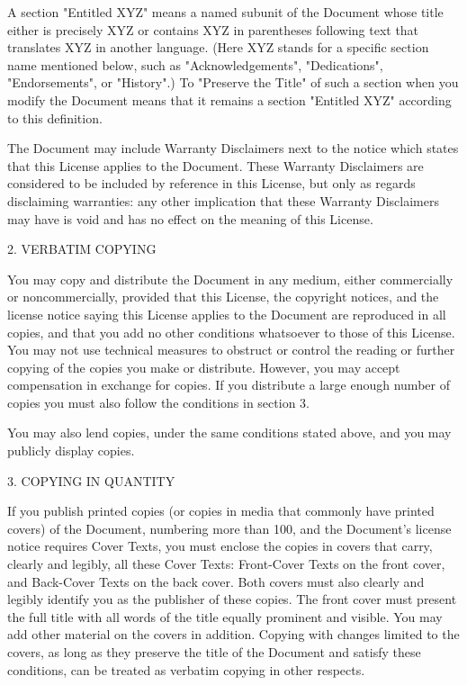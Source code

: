 \documentclass[oneside,english,a4paper,10pt,oneside,openany,final]{memoir}
\begin{document}
A section "Entitled XYZ" means a named subunit of the Document whose title either is precisely XYZ or contains XYZ in parentheses following text that translates XYZ in another language. (Here XYZ stands for a specific section name mentioned below, such as "Acknowledgements", "Dedications", "Endorsements", or "History".) To "Preserve the Title" of such a section when you modify the Document means that it remains a section "Entitled XYZ" according to this definition.

The Document may include Warranty Disclaimers next to the notice which states that this License applies to the Document. These Warranty Disclaimers are considered to be included by reference in this License, but only as regards disclaiming warranties: any other implication that these Warranty Disclaimers may have is void and has no effect on the meaning of this License.

2. VERBATIM COPYING

You may copy and distribute the Document in any medium, either commercially or noncommercially, provided that this License, the copyright notices, and the license notice saying this License applies to the Document are reproduced in all copies, and that you add no other conditions whatsoever to those of this License. You may not use technical measures to obstruct or control the reading or further copying of the copies you make or distribute. However, you may accept compensation in exchange for copies. If you distribute a large enough number of copies you must also follow the conditions in section 3.

You may also lend copies, under the same conditions stated above, and you may publicly display copies.

3. COPYING IN QUANTITY

If you publish printed copies (or copies in media that commonly have printed covers) of the Document, numbering more than 100, and the Document's license notice requires Cover Texts, you must enclose the copies in covers that carry, clearly and legibly, all these Cover Texts: Front-Cover Texts on the front cover, and Back-Cover Texts on the back cover. Both covers must also clearly and legibly identify you as the publisher of these copies. The front cover must present the full title with all words of the title equally prominent and visible. You may add other material on the covers in addition. Copying with changes limited to the covers, as long as they preserve the title of the Document and satisfy these conditions, can be treated as verbatim copying in other respects.
\end{document}
